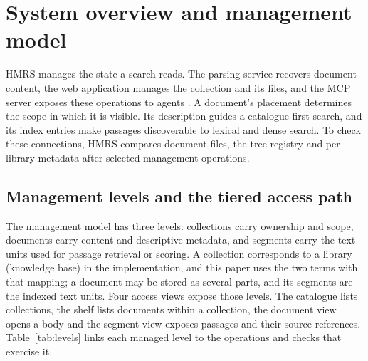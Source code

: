 \section{System overview and management model}
\label{sec:system}

HMRS manages the state a search reads. The parsing service recovers document
content, the web application manages the collection and its files, and the
MCP server exposes these operations to agents \cite{mcp}. A document's
placement determines the scope in which it is visible. Its description
guides a catalogue-first search, and its index entries make passages
discoverable to lexical and dense search. To check these connections, HMRS
compares document files, the tree registry and per-library metadata after
selected management operations.

\subsection{Management levels and the tiered access path}
\label{sec:levels}

The management model has three levels: collections carry ownership and scope,
documents carry content and descriptive metadata, and segments carry the
text units used for passage retrieval or scoring. A collection corresponds
to a library (knowledge base) in the implementation, and this paper uses
the two terms with that mapping; a document may be stored as several
parts, and its segments are the indexed text units. Four access views expose
those levels. The catalogue lists collections, the shelf lists documents
within a collection, the document view opens a body and the segment view
exposes passages and their source references. Table~\ref{tab:levels} links each
managed level to the operations and checks that exercise it.

